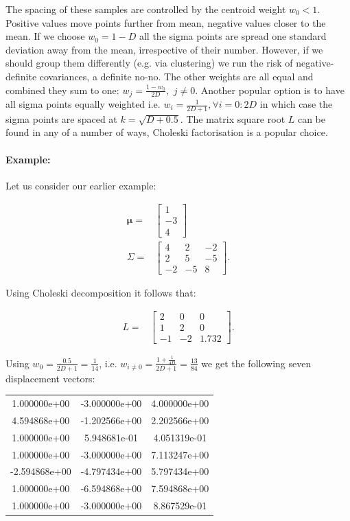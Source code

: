 The spacing of these samples are controlled by the centroid weight
$w_{0}<1$. Positive values move points further from mean, negative
values closer to the mean. If we choose $w_{0}=1-D$ all the sigma
points are spread one standard deviation away from the mean, irrespective
of their number. However, if we should group them differently (e.g.
via clustering) we run the risk of negative-definite covariances,
a definite no-no. The other weights are all equal and combined they
sum to one: $w_{j}=\frac{1-w_{0}}{2D},\,\, j\neq0$. Another popular
option is to have all sigma points equally weighted i.e. $w_{i}=\frac{1}{2D+1},\forall i=0:2D$
in which case the sigma points are spaced at $k=\sqrt{D+0.5}$. The
matrix square root $L$ can be found in any of a number of ways, Choleski
factorisation is a popular choice.


\paragraph{Example: }

Let us consider our earlier example:

\begin{align*}
\mathbf{\mu=} & \left[\begin{array}{r}
1\\
-3\\
4
\end{array}\right]\\
\Sigma= & \left[\begin{array}{rrr}
4 & 2 & -2\\
2 & 5 & -5\\
-2 & -5 & 8
\end{array}\right].
\end{align*}


Using Choleski decomposition it follows that:

\begin{align*}
L= & \left[\begin{array}{ccc}
2 & 0 & 0\\
1 & 2 & 0\\
-1 & -2 & 1.732
\end{array}\right].
\end{align*}


Using $w_{0}=\frac{0.5}{2D+1}=\frac{1}{14}$, i.e. $w_{i\neq0}=\frac{1+\frac{1}{4D}}{2D+1}=\frac{13}{84}$
we get the following seven displacement vectors:

\begin{tabular}{ccc}
 1.000000e+00 & -3.000000e+00 & 4.000000e+00   \\
 4.594868e+00 & -1.202566e+00 & 2.202566e+00   \\
 1.000000e+00 &  5.948681e-01 & 4.051319e-01   \\
 1.000000e+00 & -3.000000e+00 & 7.113247e+00   \\
-2.594868e+00 & -4.797434e+00 & 5.797434e+00   \\
 1.000000e+00 & -6.594868e+00 & 7.594868e+00   \\
 1.000000e+00 & -3.000000e+00 & 8.867529e-01
\end{tabular}

